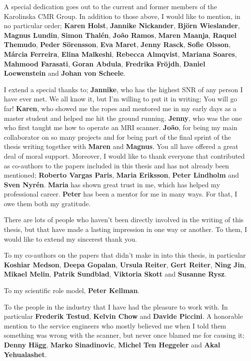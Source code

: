 \documentclass[11pt,twoside,openright]{book}
\begin{document}
A special dedication goes out to the current and former members of the Karolinska CMR Group. In addition to those above, I would like to mention, in no particular order; \textbf{Karen Holst}, \textbf{Jannike Nickander}, \textbf{Björn Wieslander}, \textbf{Magnus Lundin}, \textbf{Simon Thalén}, \textbf{João Ramos}, \textbf{Maren Maanja}, \textbf{Raquel Themudo}, \textbf{Peder Sörensson}, \textbf{Eva Maret}, \textbf{Jenny Rasck}, \textbf{Sofie Olsson}, \textbf{Márcia Ferreira}, \textbf{Elina Malkeshi}, \textbf{Rebecca Almqvist}, \textbf{Mariana Soares}, \textbf{Mahmood Farasati}, \textbf{Goran Abdula}, \textbf{Fredrika Fröjdh}, \textbf{Daniel Loewenstein} and \textbf{Johan von Scheele}.

I extend a special thanks to; \textbf{Jannike}, who has the highest SNR of any person I have ever met. We all know it, but I'm willing to put it in writing; You will go far! \textbf{Karen}, who showed me the ropes and mentored me in my early days as a master student and helped me hit the ground running. \textbf{Jenny}, who was the one who first taught me how to operate an MRI scanner. \textbf{João}, for being my main collaborator on so many projects and for being part of the final sprint of the thesis writing together with \textbf{Maren} and \textbf{Magnus}. You all have offered a great deal of moral support.
\clearpage
Moreover, I would like to thank everyone that contributed as co-authors to the papers included in this thesis and has not already been mentioned; \textbf{Roberto Vargas Paris}, \textbf{Maria Eriksson}, \textbf{Peter Lindholm} and \textbf{Sven Nyrén}. \textbf{Maria} has shown great trust in me, which has helped my professional career. \textbf{Peter} has been a mentor for me in many ways. For that, I owe them both my gratitude.


There are lots of people who haven't been directly involved in the writing of this thesis, but that have made a lasting impression in one way or another. To them, I would like to extend my sincerest thank you.

To my co-authors on the papers that didn't make in into this thesis, in particular \textbf{Koshiar Medson}, \textbf{Deepa Gopalan}, \textbf{Ursula Reiter}, \textbf{Gert Reiter}, \textbf{Ning Jin}, \textbf{Mikael Melin}, \textbf{Patrik Sundblad}, \textbf{Viktoria Skott} and \textbf{Susanne Rysz}.

To my scientific role model, \textbf{Peter Kellman}.

To the people in the industry that I have had the pleasure to work with. In particular \textbf{Frederik Testud}, \textbf{Kelvin Chow} and \textbf{Davide Piccini}. A honorable mention to the service engineers who mostly believed me when I told them something was wrong with the scanner, but never once blamed me for causing it; \textbf{Denny Hägg}, \textbf{Marko Sinadinovic}, \textbf{Michel Ten Heggeler} and \textbf{Akal Yehualashet}.
\end{document}
